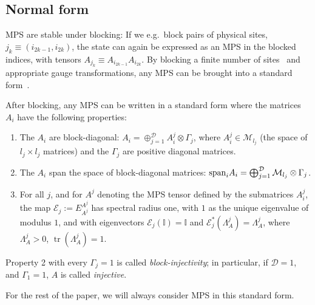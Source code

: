 \documentclass[cmp]{svjour}
\newcommand{\I}{\mathbb{I}}
\DeclareMathOperator{\trace}{tr} \DeclareMathOperator{\GL}{gl}
\begin{document}
\subsection{Normal form}

MPS are stable under blocking: If we e.g.\ block pairs of physical sites,
$j_k\equiv(i_{2k-1},i_{2k})$, the state can again be expressed as an MPS
in the blocked indices, with tensors $A_{j_k}\equiv
    A_{i_{2k-1}}A_{i_{2k}}$. By blocking a finite number of
sites~\cite{sanz:wielandt} and appropriate gauge transformations, any MPS
can be brought into a standard
form~\cite{fannes:FCS,perez-garcia:mps-reps}.
%
\begin{theorem}
    \label{thm:std-form-inj}
    After blocking, any MPS can be written in a standard form where the
    matrices $A_i$ have the following properties:
    \begin{enumerate}
        \item The $A_i$ are block-diagonal:
              $A_i=\oplus_{j=1}^\mathcal{D} A_i^j\otimes \Gamma_j$,
              where $A_i^j\in\mathcal{M}_{l_j}$ (the space of $l_j\times l_j$
              matrices) and the $\Gamma_j$ are positive diagonal
              matrices.
        \item The $A_i$ span the space of block-diagonal matrices:
              ${\rm span}_i A_i=\bigoplus_{j=1}^\mathcal{D}
                  \mathcal{M}_{l_j}\otimes \Gamma_j$.
        \item For all $j$, and for $A^j$ denoting the MPS tensor defined by the submatrices $A^j_i$,  the map $\mathcal E_j:=E_{A^j}^{A^j}$ has spectral radius one, with $1$ as the unique eigenvalue of modulus $1$, and with eigenvectors
              $\mathcal E_j(\I)=\I$ and
              $\mathcal E^*_j(\Lambda_A^j)=\Lambda^j_A$, where
              $\Lambda^j_A>0$, $\trace(\Lambda_A^j)=1$.
    \end{enumerate}
    Property 2 with every $\Gamma_j=1$ is called \emph{block-injectivity}; in particular, if
    $\mathcal{D}=1$, and $\Gamma_1=1$, $A$ is called \emph{injective}.
\end{theorem}
For the rest of the paper, we will always consider MPS in this standard
form.
\end{document}
